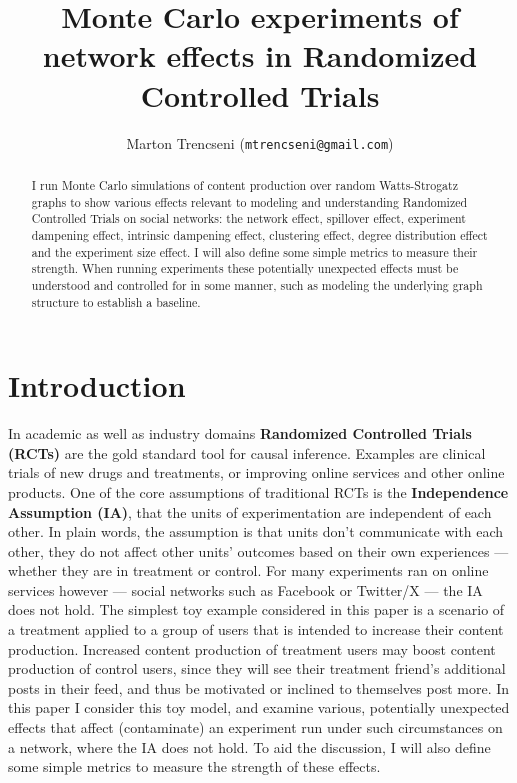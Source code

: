 \documentclass[final,5p,times,twocolumn,authoryear]{elsarticle}
\begin{document}
\begin{frontmatter}

\title{Monte Carlo experiments of network effects in Randomized Controlled Trials}

\author{Marton Trencseni (\texttt{mtrencseni@gmail.com})}

\begin{abstract}
I run Monte Carlo simulations of content production over random Watts-Strogatz graphs to show various effects relevant to modeling and understanding Randomized Controlled Trials on social networks: the network effect, spillover effect, experiment dampening effect, intrinsic dampening effect, clustering effect, degree distribution effect and the experiment size effect. I will also define some simple metrics to measure their strength. When running experiments these potentially unexpected effects must be understood and controlled for in some manner, such as modeling the underlying graph structure to establish a baseline.
 
\end{abstract}

\end{frontmatter}

\section{Introduction}

In academic as well as industry domains \textbf{Randomized Controlled Trials (RCTs)} are the gold standard tool for causal inference. Examples are clinical trials of new drugs and treatments, or improving online services and other online products. One of the core assumptions of traditional RCTs is the \textbf{Independence Assumption (IA)}, that the units of experimentation are independent of each other. In plain words, the assumption is that units don't communicate with each other, they do not affect other units' outcomes based on their own experiences --- whether they are in treatment or control. For many experiments ran on online services however --- social networks such as Facebook or Twitter/X --- the IA does not hold. The simplest toy example considered in this paper is a scenario of a treatment applied to a group of users that is intended to increase their content production. Increased content production of treatment users may boost content production of control users, since they will see their treatment friend's additional posts in their feed, and thus be motivated or inclined to themselves post more. In this paper I consider this toy model, and examine various, potentially unexpected effects that affect (contaminate) an experiment run under such circumstances on a network, where the IA does not hold. To aid the discussion, I will also define some simple metrics to measure the strength of these effects.
\end{document}

